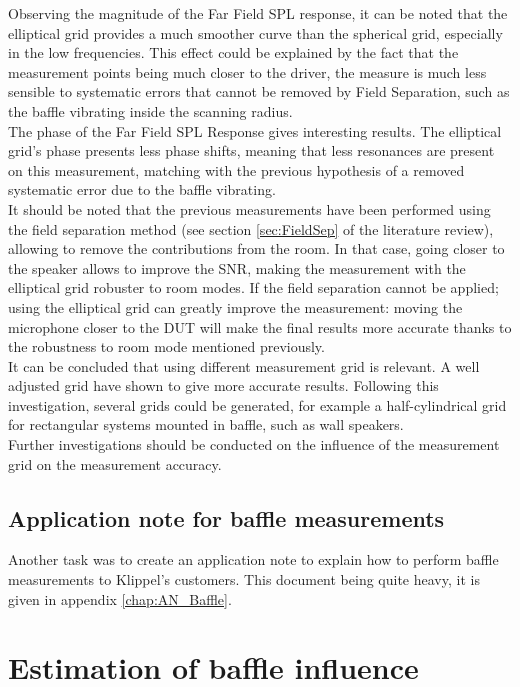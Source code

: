 \documentclass{report}
\begin{document}
Observing the magnitude of the Far Field SPL response, it can be noted that the elliptical grid provides a much smoother curve than the spherical grid, especially in the low frequencies. This effect could be explained by the fact that the measurement points being much closer to the driver, the measure is much less sensible to systematic errors that cannot be removed by Field Separation, such as the baffle vibrating inside the scanning radius. \\
The phase of the Far Field SPL Response gives interesting results. The elliptical grid's phase presents less phase shifts, meaning that less resonances are present on this measurement, matching with the previous hypothesis of a removed systematic error due to the baffle vibrating. \\

It should be noted that the previous measurements have been performed using the field separation method (see section \ref{sec:FieldSep} of the literature review), allowing to remove the contributions from the room. In that case, going closer to the speaker allows to improve the SNR, making the measurement with the elliptical grid robuster to room modes.
If the field separation cannot be applied; using the elliptical grid can greatly improve the measurement: moving the microphone closer to the DUT will make the final results more accurate thanks to the robustness to room mode mentioned previously. \\

It can be concluded that using different measurement grid is relevant. A well adjusted grid have shown to give more accurate results. Following this investigation, several grids could be generated, for example a half-cylindrical grid for rectangular systems mounted in baffle, such as wall speakers.\\
Further investigations should be conducted on the influence of the measurement grid on the measurement accuracy.

\subsection{Application note for baffle measurements}

Another task was to create an application note to explain how to perform baffle measurements to Klippel's customers. This document being quite heavy, it is given in appendix \ref{chap:AN_Baffle}.

\section{Estimation of baffle influence}
\end{document}
